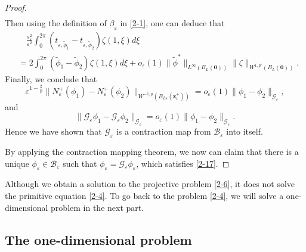 \documentclass[12pt,reqno]{amsart}
\numberwithin{equation}{section}
\theoremstyle{definition}
\theoremstyle{remark}
\newcommand{\ep}{\varepsilon}
\begin{document}
\begin{proof}
\begin{align*}
		\end{align*}
		Then using the definition of $\mathcal \beta_\varepsilon$ in \eqref{2-1}, one can deduce that
		\begin{align*}
				&\quad\frac{s_\varepsilon^2}{\varepsilon^2}\int_0^{2\pi}(t_{\varepsilon,\tilde\phi_1}-t_{\varepsilon,\tilde\phi_2})\zeta(1,\xi)d\xi\\
				&=2\int_0^{2\pi}(\tilde\phi_1-\tilde\phi_2)\zeta(1,\xi)d\xi+o_\varepsilon(1)\|\tilde\phi^*\|_{L^\infty(B_L(\boldsymbol 0))}\|\zeta\|_{W^{1,p'}(B_L(\boldsymbol 0))}.
		\end{align*}
		Finally, we conclude that
		\begin{equation*}
			\varepsilon^{1-\frac{2}{p}}\|N^+_\varepsilon(\phi_1)-N^+_\varepsilon(\phi_2) \|_{W^{-1,p}(B_{L\ep}(\boldsymbol z_1^+))}=o_\varepsilon(1) \|\phi_1-\phi_2\|_{\mathcal G_\varepsilon},
		\end{equation*}
		and
		\begin{equation*}
			\|\mathcal G_\varepsilon\phi_1-\mathcal G_\varepsilon\phi_2\|_{\mathcal G_\varepsilon}=o_\varepsilon(1) \|\phi_1-\phi_2\|_{\mathcal G_\varepsilon}.
		\end{equation*}
		Hence we have shown that $\mathcal G_\varepsilon$ is a contraction map from $\mathcal B_\varepsilon$ into itself.
		
		By applying the contraction mapping theorem, we now can claim that there is a unique $\phi_\varepsilon\in \mathcal B_\varepsilon$ such that $\phi_\varepsilon=\mathcal G_\varepsilon\phi_\varepsilon$, which satisfies \eqref{2-17}. 
	\end{proof}
	
	Although we obtain a solution to the projective problem \eqref{2-6}, it does not solve the primitive equation \eqref{2-4}. To go back to the 
	problem \eqref{2-4}, we will solve a one-dimensional problem in the next part.
	
	\subsection{The one-dimensional problem}
	
\end{document}
